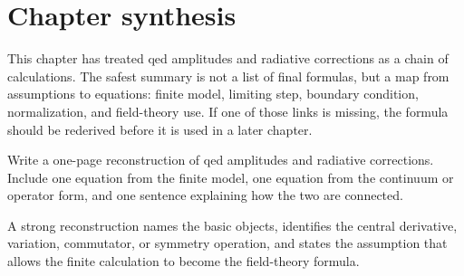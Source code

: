 \section{Chapter synthesis}

This chapter has treated qed amplitudes and radiative corrections as a chain of calculations.  The safest summary is not a list of final formulas, but a map from assumptions to equations: finite model, limiting step, boundary condition, normalization, and field-theory use.  If one of those links is missing, the formula should be rederived before it is used in a later chapter.

\begin{exercise}
Write a one-page reconstruction of qed amplitudes and radiative corrections.  Include one equation from the finite model, one equation from the continuum or operator form, and one sentence explaining how the two are connected.
\begin{answer}
A strong reconstruction names the basic objects, identifies the central derivative, variation, commutator, or symmetry operation, and states the assumption that allows the finite calculation to become the field-theory formula.
\end{answer}
\end{exercise}
